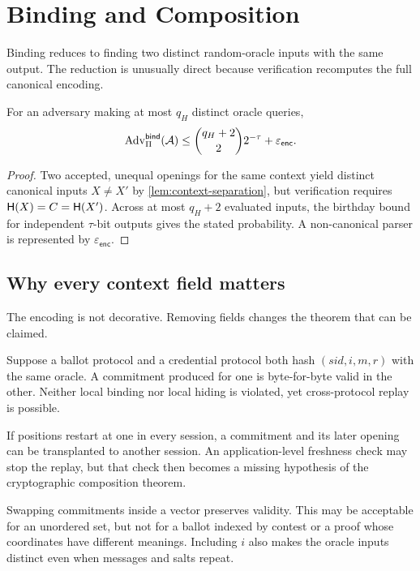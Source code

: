 \section{Binding and Composition}
\label{sec:binding}

Binding reduces to finding two distinct random-oracle inputs with the same
output.  The reduction is unusually direct because verification recomputes
the full canonical encoding.

\begin{theorem}[Binding]
\label{thm:binding}
For an adversary making at most $q_H$ distinct oracle queries,
\[
  \operatorname{Adv}^{\mathsf{bind}}_\Pi(\mathcal{A})
  \leq \binom{q_H+2}{2}2^{-\tau}+\varepsilon_{\mathsf{enc}}.
\]
\end{theorem}

\begin{proof}
Two accepted, unequal openings for the same context yield distinct canonical
inputs $X\neq X'$ by \cref{lem:context-separation}, but verification requires
$\mathsf{H}(X)=C=\mathsf{H}(X')$.  Across at most $q_H+2$ evaluated inputs, the birthday
bound for independent $\tau$-bit outputs gives the stated probability.  A
non-canonical parser is represented by $\varepsilon_{\mathsf{enc}}$.
\end{proof}

\subsection{Why every context field matters}

The encoding is not decorative.  Removing fields changes the theorem that can
be claimed.

 Suppose a ballot protocol and a credential protocol
both hash $(sid,i,m,r)$ with the same oracle.  A commitment produced for one is
byte-for-byte valid in the other.  Neither local binding nor local hiding is
violated, yet cross-protocol replay is possible.

 If positions restart at one in every session,
a commitment and its later opening can be transplanted to another session.
An application-level freshness check may stop the replay, but that check then
becomes a missing hypothesis of the cryptographic composition theorem.

 Swapping commitments inside a vector preserves validity.
This may be acceptable for an unordered set, but not for a ballot indexed by
contest or a proof whose coordinates have different meanings.  Including $i$
also makes the oracle inputs distinct even when messages and salts repeat.

